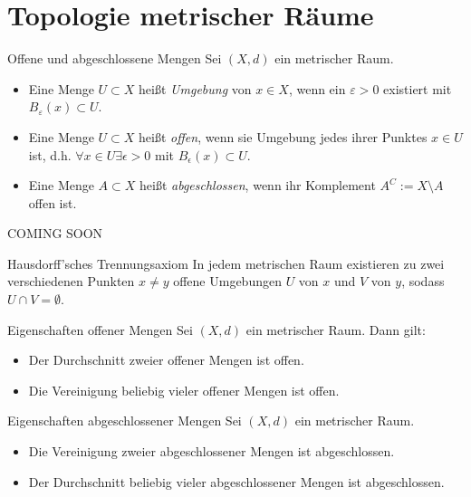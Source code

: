 \newpage
\section{Topologie metrischer Räume}
\begin{definition}{Offene und abgeschlossene Mengen}
    Sei $(X,d)$ ein metrischer Raum.
    \begin{itemize}
        \item[(i)] Eine Menge $U\subset X$ heißt \emph{Umgebung} von $x\in X$, wenn ein $\varepsilon>0$ existiert mit $B_\varepsilon(x)\subset U$.
        \item[(ii)] Eine Menge $U\subset X$ heißt \emph{offen}, wenn sie Umgebung jedes ihrer Punktes $x\in U$ ist, d.h. $\forall x \in U \exists \epsilon > 0$ mit $B_\epsilon(x)\subset U$.
        \item[(iii)] Eine Menge $A\subset X$ heißt \emph{abgeschlossen}, wenn ihr Komplement $A^C := X\setminus A$ offen ist.
    \end{itemize}
\end{definition}

\begin{beispielbox}
    COMING SOON
\end{beispielbox}

\begin{satz}{Hausdorff'sches Trennungsaxiom}
    In jedem metrischen Raum existieren zu zwei verschiedenen Punkten $x\neq y$ offene Umgebungen $U$ von $x$ und $V$ von $y$, sodass $U\cap V=\emptyset$.
\end{satz}

\begin{satz}{Eigenschaften offener Mengen}
    Sei $(X,d)$ ein metrischer Raum. Dann gilt:
    \begin{itemize}
        \item[(1)] Der Durchschnitt zweier offener Mengen ist offen.
        \item[(2)] Die Vereinigung beliebig vieler offener Mengen ist offen.
    \end{itemize}
\end{satz}

\begin{satz}{Eigenschaften abgeschlossener Mengen}
    Sei $(X,d)$ ein metrischer Raum.
    \begin{itemize}
        \item[(1)] Die Vereinigung zweier abgeschlossener Mengen ist abgeschlossen.
        \item[(2)] Der Durchschnitt beliebig vieler abgeschlossener Mengen ist abgeschlossen.
    \end{itemize}
\end{satz}

